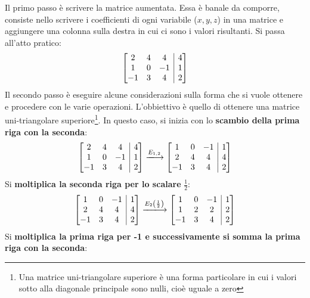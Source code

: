 \documentclass[a4paper]{article}
\makeatletter
\newenvironment{rowequmatbra}[1]{\left[\array{@{}#1@{}}}{\endarray\right]}
\makeatother
\begin{document}
	\noindent
	Il \textcolor{Red3}{primo passo} è scrivere la matrice aumentata. Essa è banale da comporre, consiste nello scrivere i coefficienti di ogni variabile ($x,y,z$) in una matrice e aggiungere una colonna sulla destra in cui ci sono i valori risultanti. Si passa all'atto pratico:
	\begin{equation*}
		\begin{rowequmatbra}{ccc|c}
			2  & 4 &  4 & 4 \\
			1  & 0 & -1 & 1 \\
			-1 & 3 &  4 & 2
		\end{rowequmatbra}
	\end{equation*}
	Il \textcolor{Red3}{secondo passo} è eseguire alcune considerazioni sulla forma che si vuole ottenere e procedere con le varie operazioni. L'obbiettivo è quello di ottenere una matrice uni-triangolare superiore\footnote{Una matrice uni-triangolare superiore è una forma particolare in cui i valori sotto alla diagonale principale sono nulli, cioè uguale a zero}. In questo caso, si inizia con lo \textbf{scambio della prima riga con la seconda}:
	\begin{equation*}
		\begin{rowequmatbra}{ccc|c}
			2  & 4 &  4 & 4 \\
			1  & 0 & -1 & 1 \\
			-1 & 3 &  4 & 2
		\end{rowequmatbra} \xlongrightarrow{E_{1,2}}
		\begin{rowequmatbra}{ccc|c}
			1  & 0 & -1 & 1 \\
			2  & 4 &  4 & 4 \\
			-1 & 3 &  4 & 2
		\end{rowequmatbra}
	\end{equation*}
	Si \textbf{moltiplica la seconda riga per lo scalare} $\frac{1}{2}$:
	\begin{equation*}
		\begin{rowequmatbra}{ccc|c}
			1  & 0 & -1 & 1 \\
			2  & 4 &  4 & 4 \\
			-1 & 3 &  4 & 2
		\end{rowequmatbra} \xlongrightarrow{E_{2}\left(\frac{1}{2}\right)}
		\begin{rowequmatbra}{ccc|c}
			1  & 0 & -1 & 1 \\
			1  & 2 &  2 & 2 \\
			-1 & 3 &  4 & 2
		\end{rowequmatbra}
	\end{equation*}
	Si \textbf{moltiplica la prima riga per -1 e successivamente si somma la prima riga con la seconda}:
\end{document}
